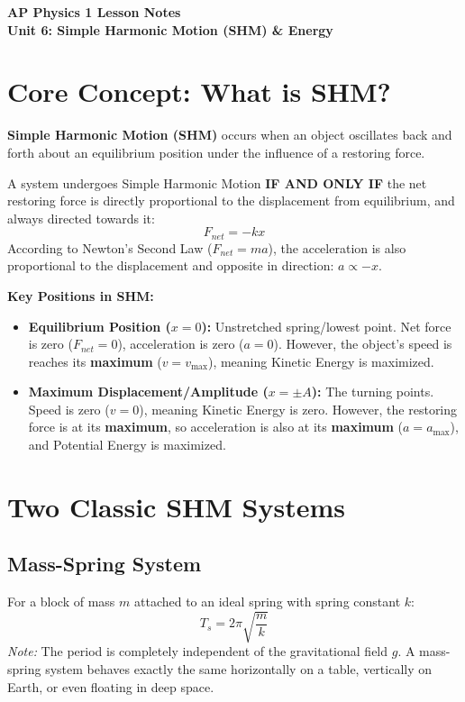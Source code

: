 \documentclass[12pt]{article}
\begin{document}
\begin{center}
{\LARGE \textbf{AP Physics 1 Lesson Notes}}\\
\vspace{0.2cm}
{\large \textbf{Unit 6: Simple Harmonic Motion (SHM) \& Energy}}
\end{center}
\vspace{0.4cm}

\section{Core Concept: What is SHM?}

\textbf{Simple Harmonic Motion (SHM)} occurs when an object oscillates back and forth about an equilibrium position under the influence of a restoring force.

\begin{tcolorbox}[colback=blue!5,colframe=blue!75!black,title=The Golden Rule of SHM]
A system undergoes Simple Harmonic Motion \textbf{IF AND ONLY IF} the net restoring force is directly proportional to the displacement from equilibrium, and always directed towards it:
\[ F_{net} = -kx \]
According to Newton's Second Law ($F_{net}=ma$), the acceleration is also proportional to the displacement and opposite in direction: $a \propto -x$.
\end{tcolorbox}

\textbf{Key Positions in SHM:}
\begin{itemize}
    \item \textbf{Equilibrium Position ($x = 0$):} Unstretched spring/lowest point. Net force is zero ($F_{net}=0$), acceleration is zero ($a=0$). However, the object's speed is reaches its \textbf{maximum} ($v=v_{\max}$), meaning Kinetic Energy is maximized.
    \item \textbf{Maximum Displacement/Amplitude ($x = \pm A$):} The turning points. Speed is zero ($v=0$), meaning Kinetic Energy is zero. However, the restoring force is at its \textbf{maximum}, so acceleration is also at its \textbf{maximum} ($a=a_{\max}$), and Potential Energy is maximized.
\end{itemize}

\section{Two Classic SHM Systems}

\subsection{Mass-Spring System}
For a block of mass $m$ attached to an ideal spring with spring constant $k$:
\[ T_s = 2\pi\sqrt{\frac{m}{k}} \]
\textit{Note:} The period is completely independent of the gravitational field $g$. A mass-spring system behaves exactly the same horizontally on a table, vertically on Earth, or even floating in deep space.
\end{document}
